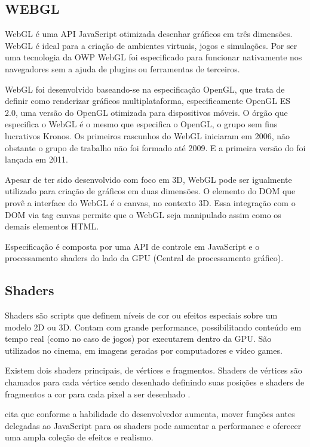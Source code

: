 \subsection{WEBGL}
\begin{draft}

WebGL é uma API JavaScript otimizada desenhar gráficos em três dimensões.
WebGL é ideal para a criação de ambientes virtuais, jogos e simulações.
Por ser uma tecnologia da OWP WebGL foi especificado para funcionar
nativamente nos navegadores sem a ajuda de plugins ou ferramentas de terceiros.

WebGL foi desenvolvido baseando-se na especificação OpenGL, que trata
de definir como renderizar gráficos multiplataforma, especificamente
OpenGL ES 2.0, uma versão do OpenGL otimizada para dispositivos
móveis. O órgão que especifica o WebGL é o mesmo que especifica o
OpenGL, o grupo sem fins lucrativos Kronos. Os primeiros rascunhos do
WebGL iniciaram em 2006, não obstante o grupo de trabalho não foi
formado até 2009. E a primeira versão do foi lançada em 2011.

Apesar de ter sido desenvolvido com foco em 3D, WebGL pode ser
igualmente utilizado para criação de gráficos em duas
dimensões\autocite[pp. 6]{3daps}. O elemento do DOM que provê a
interface do WebGL é o canvas, no contexto 3D. Essa integração com
o DOM via tag canvas permite que o WebGL seja manipulado assim como os
demais elementos HTML.

Especificação é composta por uma API de controle em JavaScript e o
processamento shaders do lado da GPU (Central de processamento gráfico).

\subsection{Shaders}

Shaders são scripts que definem níveis de cor ou efeitos especiais
sobre um modelo 2D ou 3D. Contam com grande performance, possibilitando
conteúdo em tempo real (como no caso de jogos) por executarem dentro
da GPU. São utilizados no cinema, em imagens geradas por computadores e
vídeo games.

Existem dois shaders principais, de vértices e fragmentos.
Shaders de vértices são chamados para cada vértice sendo desenhado
definindo suas posições e shaders de fragmentos a cor para cada pixel
a ser desenhado \autocite[pp.15]{3daps}.

\cite{html5mostwanted} cita que conforme a habilidade do desenvolvedor
aumenta, mover funções antes delegadas ao JavaScript para os shaders
pode aumentar a performance e oferecer uma ampla coleção de efeitos e
realismo.


\end{draft}

